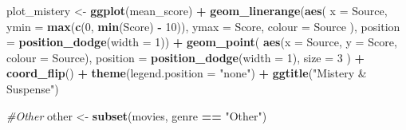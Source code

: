 \documentclass[]{article}
\newenvironment{Shaded}{\begin{snugshade}}{\end{snugshade}}
\newcommand{\CommentTok}[1]{\textcolor[rgb]{0.56,0.35,0.01}{\textit{#1}}}
\newcommand{\DataTypeTok}[1]{\textcolor[rgb]{0.13,0.29,0.53}{#1}}
\newcommand{\DecValTok}[1]{\textcolor[rgb]{0.00,0.00,0.81}{#1}}
\newcommand{\KeywordTok}[1]{\textcolor[rgb]{0.13,0.29,0.53}{\textbf{#1}}}
\newcommand{\NormalTok}[1]{#1}
\newcommand{\OperatorTok}[1]{\textcolor[rgb]{0.81,0.36,0.00}{\textbf{#1}}}
\newcommand{\StringTok}[1]{\textcolor[rgb]{0.31,0.60,0.02}{#1}}
\begin{document}
\begin{Shaded}
\begin{Highlighting}[]
\NormalTok{plot_mistery <-}\StringTok{ }\KeywordTok{ggplot}\NormalTok{(mean_score) }\OperatorTok{+}\StringTok{ }\KeywordTok{geom_linerange}\NormalTok{(}\KeywordTok{aes}\NormalTok{(}
  \DataTypeTok{x =}\NormalTok{ Source,}
  \DataTypeTok{ymin =} \KeywordTok{max}\NormalTok{(}\KeywordTok{c}\NormalTok{(}\DecValTok{0}\NormalTok{, }\KeywordTok{min}\NormalTok{(Score) }\OperatorTok{-}\StringTok{ }\DecValTok{10}\NormalTok{)),}
  \DataTypeTok{ymax =}\NormalTok{ Score,}
  \DataTypeTok{colour =}\NormalTok{ Source}
\NormalTok{),}
\DataTypeTok{position =} \KeywordTok{position_dodge}\NormalTok{(}\DataTypeTok{width =} \DecValTok{1}\NormalTok{)) }\OperatorTok{+}\StringTok{  }\KeywordTok{geom_point}\NormalTok{(}
  \KeywordTok{aes}\NormalTok{(}\DataTypeTok{x =}\NormalTok{ Source, }\DataTypeTok{y =}\NormalTok{ Score, }\DataTypeTok{colour =}\NormalTok{ Source),}
  \DataTypeTok{position =} \KeywordTok{position_dodge}\NormalTok{(}\DataTypeTok{width =} \DecValTok{1}\NormalTok{),}
  \DataTypeTok{size =} \DecValTok{3}
\NormalTok{) }\OperatorTok{+}\StringTok{ }\KeywordTok{coord_flip}\NormalTok{() }\OperatorTok{+}\StringTok{ }\KeywordTok{theme}\NormalTok{(}\DataTypeTok{legend.position =} \StringTok{"none"}\NormalTok{) }\OperatorTok{+}\StringTok{ }\KeywordTok{ggtitle}\NormalTok{(}\StringTok{"Mistery & Suspense"}\NormalTok{)}

\CommentTok{#Other}
\NormalTok{other <-}\StringTok{ }\KeywordTok{subset}\NormalTok{(movies, genre }\OperatorTok{==}\StringTok{ "Other"}\NormalTok{)}


\end{Highlighting}
\end{Shaded}
\end{document}
